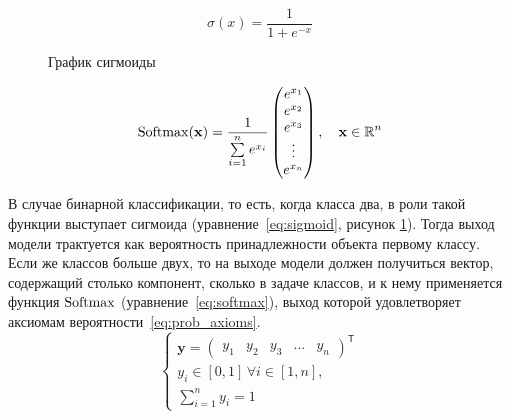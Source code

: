\begin{equation}
    \label{eq:sigmoid}
    \sigma(x)=\frac{1}{1+e^{-x}}
\end{equation}

\begin{figure}[h]
    \centering
    \caption{График сигмоиды}
    \label{fig:sigmoid}
\end{figure}

\begin{equation}
    \label{eq:softmax}
    \operatorname{Softmax}(\mathbf{x})=\frac{1}{\sum\limits_{i=1}^n e^{x_i}}
    \left(\begin{matrix}
        e^{x_1} \\
        e^{x_2} \\
        e^{x_3} \\
        \vdots \\
        e^{x_n}
    \end{matrix}\right),\quad \mathbf{x}\in \operatorname{\mathbb{R}}^n
\end{equation}

В случае бинарной классификации, то есть, когда класса два, в роли такой функции выступает сигмоида (уравнение \ref*{eq:sigmoid}, рисунок \ref*{fig:sigmoid}). Тогда выход модели трактуется как вероятность принадлежности объекта первому классу. Если же классов больше двух, то на выходе модели должен получиться вектор, содержащий столько компонент, сколько в задаче классов, и к нему применяется функция $\operatorname{Softmax}$ (уравнение \ref*{eq:softmax}), выход которой удовлетворяет аксиомам вероятности \ref*{eq:prob_axioms}.
\begin{equation}
    \label{eq:prob_axioms}
    \begin{cases}
        \mathbf{y}=\left(\begin{matrix}
            y_1 & y_2 & y_3 & \dots & y_n
        \end{matrix}\right)^\mathsf{T} \\
        y_i \in [0, 1]\,\forall i\in[1, n], \\
        \sum\limits_{i=1}^n y_i = 1
    \end{cases}
\end{equation}

